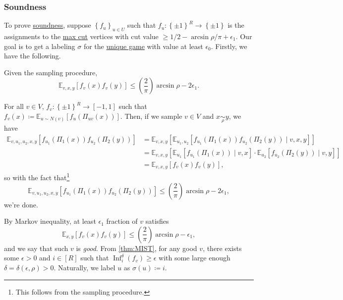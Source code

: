 \subsubsection{Soundness}
To prove \hyperref[def:soundness]{soundness}, suppose \(\left\{ f_u \right\} _{u\in U}\) such that \(f_u\colon \left\{ \pm 1 \right\} ^R \to \left\{ \pm 1 \right\} \) is the assignments to the \hyperref[prb:max-cut]{max cut} vertices with cut value \(\geq 1 / 2 - \arcsin \rho / \pi + \epsilon _1\). Our goal is to get a labeling \(\sigma \) for the \hyperref[prb:unique-game]{unique game} with value at least \(\epsilon _0\). Firstly, we have the following.

\begin{claim}
	Given the sampling procedure,
	\[
		\mathbb{E}_{v, x, y}\left[ f_v(x) f_v(y) \right]
		\leq \left( \frac{2}{\pi } \right) \arcsin \rho - 2\epsilon _1.
	\]
\end{claim}
\begin{explanation}
	For all \(v\in V\), \(f_v \colon \left\{ \pm 1 \right\} ^R \to [-1, 1]\) such that \(f_v(x) \coloneqq \mathbb{E}_{u \sim N(v)}\left[f_u (\Pi _{uv} (x) ) \right]\). Then, if we sample \(v\in V\) and \(x \underset{\rho }{\sim } y\), we have
	\[
		\begin{split}
			\mathbb{E}_{v, u_1, u_2, x, y}\left[f_{u_1}(\Pi _1(x)) f_{u_2}(\Pi _2(y)) \right]
			&= \mathbb{E}_{v, x, y}\left[ \mathbb{E}_{u_1, u_2}\left[ f_{u_1}(\Pi _1(x)) f_{u_2}(\Pi _2(y)) \mid v, x, y\right] \right] \\
			&= \mathbb{E}_{v, x, y}\left[ \mathbb{E}_{u_1}\left[ f_{u_1}(\Pi _1(x)) \mid v, x\right] \cdot \mathbb{E}_{u_2}\left[f_{u_2}(\Pi _2(y)) \mid v, y \right] \right] \\
			&= \mathbb{E}_{v, x, y}\left[ f_v(x) f_v(y) \right],
		\end{split}
	\]
	so with the fact that\footnote{This follows from the sampling procedure.}
	\[
		\mathbb{E}_{v, u_1, u_2, x, y}\left[f_{u_1}(\Pi _1(x)) f_{u_2}(\Pi _2(y)) \right]
		\leq \left( \frac{2}{\pi } \right) \arcsin \rho - 2\epsilon _1,
	\]
	we're done.
\end{explanation}

By Markov inequality, at least \(\epsilon _1\) fraction of \(v\) satisfies
\[
	\mathbb{E}_{x, y}\left[f_v(x) f_v(y) \right] \leq \left( \frac{2}{\pi } \right) \arcsin \rho - \epsilon _1,
\]
and we say that such \(v\) is \emph{good}. From \autoref{thm:MIST}, for any good \(v\), there exists some \(\epsilon > 0\) and \(i\in [R]\) such that \(\mathop{\mathrm{Inf}}_i^\delta (f_v)\geq \epsilon\) with some large enough \(\delta = \delta (\epsilon , \rho ) > 0\). Naturally, we label \(u\) as \(\sigma (u) \coloneqq i\).

